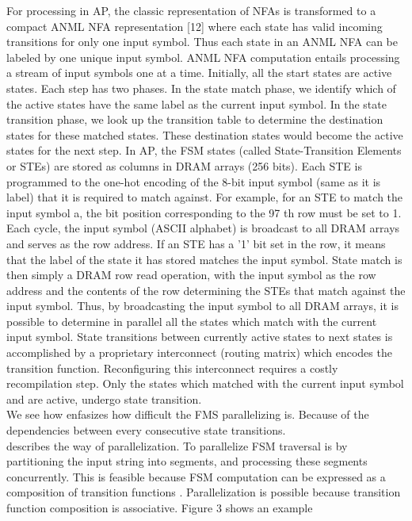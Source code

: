 For processing in AP, the classic representation of NFAs is transformed to a compact ANML NFA representation [12] where each
state has valid incoming transitions for only one input symbol. Thus
each state in an ANML NFA can be labeled by one unique input
symbol. ANML NFA computation entails processing a stream of
input symbols one at a time. Initially, all the start states are active
states. Each step has two phases. In the state match phase, we identify which of the active states have the same label as the current input
symbol. In the state transition phase, we look up the transition table
to determine the destination states for these matched states. These
destination states would become the active states for the next step.
In AP, the FSM states (called State-Transition Elements or STEs)
are stored as columns in DRAM arrays (256 bits). Each STE is
programmed to the one-hot encoding of the 8-bit input symbol (same
as it is label) that it is required to match against. For example, for an
STE to match the input symbol a, the bit position corresponding to
the 97 th row must be set to 1.\\
Each cycle, the input symbol (ASCII alphabet) is broadcast to all
DRAM arrays and serves as the row address. If an STE has a ’1’
bit set in the row, it means that the label of the state it has stored
matches the input symbol. State match is then simply a DRAM row
read operation, with the input symbol as the row address and the
contents of the row determining the STEs that match against the
input symbol. Thus, by broadcasting the input symbol to all DRAM
arrays, it is possible to determine in parallel all the states which
match with the current input symbol.
State transitions between currently active states to next states is
accomplished by a proprietary interconnect (routing matrix) which
encodes the transition function. Reconfiguring this interconnect
requires a costly recompilation step. Only the states which matched
with the current input symbol and are active, undergo state transition.\\
We see how \cite{1} enfasizes how difficult the FMS parallelizing is. Because of the dependencies between every consecutive state transitions.\\
\cite{1} describes the way of parallelization. To parallelize FSM traversal is by partitioning the input string into segments, and processing these segments concurrently. This is feasible because FSM computation can be expressed as a composition of transition functions . Parallelization is possible because transition function composition is associative. Figure 3 shows an example
